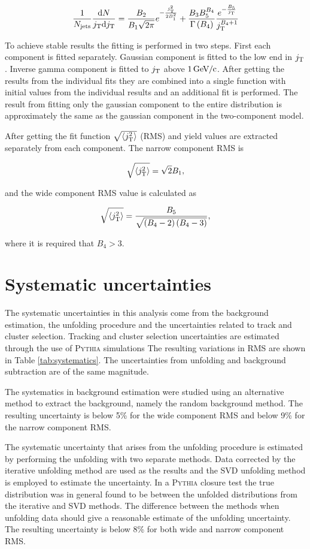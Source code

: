 \begin{equation}
\frac{1}{N_{\mathrm{jets}}}\frac{\mathrm{d}N}{j_{\rm T} \mathrm{d}j_{\rm T}} = \frac{B_2}{B_1\sqrt{2\pi}}e^{-\frac{j_{\rm T}^2}{2B_1^2}}+\frac{B_3B_5^{B_4}}{\Gamma\left(B_4\right)}\frac{e^{-\frac{B_5}{j_{\rm T}}}}{j_{\rm T}^{B_4+1}}
\label{eq:fit}
\end{equation}

To achieve stable results the fitting is performed in two steps. First each component is fitted separately. Gaussian component is fitted to the low end in $j_{\rm T}$. Inverse gamma component is fitted to $j_{\rm T}$ above $\unit[1]{\GeVc}$. After getting the results from the individual fits they are combined into a single function with initial values from the individual results and an additional fit is performed. The result from fitting only
the gaussian component to the entire distribution is approximately the same as the gaussian component in the two-component model.

After getting the fit function $\sqrt{\left<j_{\rm T}^2\right>}$ (RMS) and yield values are  extracted separately from each component. The narrow component RMS is

$$\sqrt{\left<j_{\rm T}^2\right>}=\sqrt{2}B_1,$$

and the wide component RMS value is calculated as

$$\sqrt{\left<j_{\rm T}^2\right>}=\frac{B_5}{\sqrt{\left(B_4-2\right)\left(B_4-3\right)}},$$

where it is required that $B_4 > 3$.

\section{Systematic uncertainties}
\label{sec:systematicerrors}
The systematic uncertainties in this analysis come from the background estimation, the unfolding procedure and the uncertainties related to track and cluster selection. Tracking and cluster selection uncertainties are estimated through the use of \textsc{Pythia} simulations The resulting variations in RMS are shown in Table \ref{tab:systematics}. The uncertainties from unfolding and background subtraction are of the same magnitude.

The systematics in background estimation were studied using an alternative method to extract the background, namely the random background method. The resulting uncertainty is below 5\% for the wide component RMS and below 9\% for the narrow component RMS.

The systematic uncertainty that arises from the unfolding procedure is estimated by performing the unfolding with two separate methods. Data corrected by the iterative unfolding method are used as the results and the SVD unfolding method is employed to estimate the uncertainty. In a \textsc{Pythia} closure test the true distribution was in general found to be between the unfolded distributions from the iterative and SVD methods. The difference between the methods when unfolding data should give a reasonable estimate of the unfolding uncertainty. The resulting uncertainty is below 8\% for both wide and narrow component RMS.

